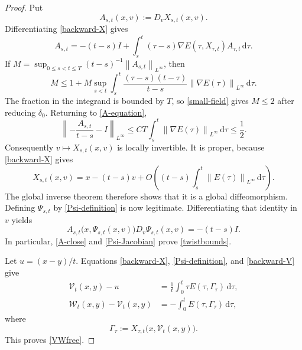 \documentclass[10pt,a4paper]{amsart}
\newcommand{\dd}{\,\mathrm d}
\newcommand{\norm}[1]{\left\lVert #1\right\rVert}
\begin{document}
\begin{proof}
Put
\begin{equation*}
 A_{s,t}(x,v):=D_vX_{s,t}(x,v).
\end{equation*}
Differentiating \eqref{backward-X} gives
\begin{equation}\label{A-equation}
 A_{s,t}=-(t-s)I+
 \int_s^t(\tau-s)\nabla E(\tau,X_{\tau,t})A_{\tau,t}\dd\tau.
\end{equation}
If
 $M=\sup_{0\leq s<t\leq T}(t-s)^{-1}\norm{A_{s,t}}_{L^\infty}$, then
\begin{equation*}
 M\leq1+M\sup_{s<t}\int_s^t
 \frac{(\tau-s)(t-\tau)}{t-s}\norm{\nabla E(\tau)}_{L^\infty}\dd\tau.
\end{equation*} 
The fraction in the integrand is bounded by $T$, so
\eqref{small-field} gives $M\leq2$ after reducing $\delta_0$.  Returning to
\eqref{A-equation},
 \begin{equation}\label{A-close}
 \norm{-\frac{A_{s,t}}{t-s}-I}_{L^\infty}
 \leq C T\int_s^t\norm{\nabla E(\tau)}_{L^\infty}\dd\tau
 \leq\frac{1}{2}.
\end{equation} 
Consequently $v\mapsto X_{s,t}(x,v)$ is locally invertible.  It is proper,
because \eqref{backward-X} gives
 \begin{equation*}
 X_{s,t}(x,v)=x-(t-s)v+
 O\left((t-s)\int_s^t\norm{E(\tau)}_{L^\infty}\dd\tau\right).
\end{equation*} 
The global inverse theorem therefore shows that it is a global
diffeomorphism.  Defining $\Psi_{s,t}$ by \eqref{Psi-definition} is now
legitimate.  Differentiating that identity in $v$ yields
\begin{equation}\label{Psi-Jacobian}
 A_{s,t}\bigl(x,\Psi_{s,t}(x,v)\bigr)
 D_v\Psi_{s,t}(x,v)=-(t-s)I.
\end{equation}
In particular, \eqref{A-close} and \eqref{Psi-Jacobian} prove
\eqref{twistbounds}.

Let $u=(x-y)/t$.  Equations \eqref{backward-X},
\eqref{Psi-definition}, and \eqref{backward-V} give
\begin{align*}
 \mathcal V_t(x,y)-u
 &=\frac{1}{t}\int_0^t\tau E(\tau,\Gamma_\tau)\dd\tau,\\
 \mathcal W_t(x,y)-\mathcal V_t(x,y)
 &=-\int_0^tE(\tau,\Gamma_\tau)\dd\tau,
\end{align*}
where
\begin{equation*}
 \Gamma_\tau
 :=X_{\tau,t}\bigl(x,\mathcal V_t(x,y)\bigr).
\end{equation*}
This proves \eqref{VWfree}.


\end{proof}
\end{document}

